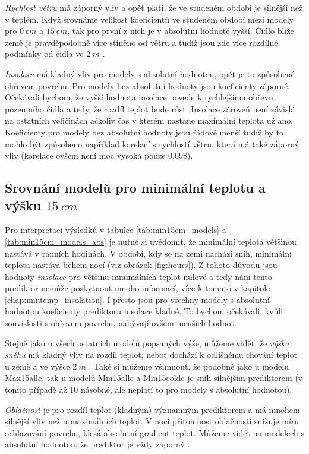 \textit{Rychlost větru} má záporný vliv a opět platí, že ve studeném období je silnější než v teplém. Když srovnáme velikost koeficientů ve studeném období mezi modely pro $\SI{0}{cm}$ a $\SI{15}{cm}$, tak pro první z nich je v absolutní hodnotě vyšší. Čidlo blíže země je pravděpodobně více stíněno od větru a tudíž jsou zde více rozdílné podmínky od čidla ve $\SI{2}{m}$ \parencite{wind_contrastingmicroclimates}. 

\textit{Insolace} má kladný vliv pro modely s absolutní hodnotou, opět je to způsobené ohřevem povrchu. Pro modely bez absolutní hodnoty jsou koeficienty záporné. Očekávali bychom, že vyšší hodnota insolace povede k rychlejšímu ohřevu pozemního čidla a tedy, že rozdíl teplot bude růst. Insolace zároveň není závislá na ostatních veličinách ačkoliv čas v kterém nastane maximální teplota už ano. Koeficienty pro modely bez absolutní hodnoty jsou řádově menší tudíž by to mohlo být způsobeno například korelací s rychlostí větru, která má také záporný vliv (korelace ovšem není moc vysoká pouze $0.098$).

\subsection{Srovnání modelů pro minimální teplotu a výšku $\SI{15}{cm}$}
Pro interpretaci výsledků v tabulce \ref{tab:min15cm_models} a \ref{tab:min15cm_models_abs} je nutné si uvědomit, že minimální teplota většinou nastává v ranních hodinách. V období, kdy se na zemi nachází sníh, minimální teplota nastává během nocí (viz obrázek \ref{fig:hours}). Z tohoto důvodu jsou hodnoty \textit{insolace} pro většinu minimálních teplot nulové a tedy nám tento prediktor nemůže poskytnout mnoho informací, více k tomuto v kapitole \ref{chap:mintemp_insolation}. I přesto jsou pro všechny modely s absolutní hodnotou koeficienty prediktoru insolace kladné. To bychom očekávali, kvůli souvislosti s ohřevem povrchu, nabývají ovšem menších hodnot.

Stejně jako u všech ostatních modelů popsaných výše, můžeme vidět, že \textit{výška sněhu} má kladný vliv na rozdíl teplot, neboť dochází k odlišnému chování teplot u země a ve výšce $\SI{2}{m}$ \parencite{snow_deFrenneForestMicroclimates}. Také si můžeme všimnout, že podobně jako u modelu Max15allc, tak u modelů Min15allc a Min15coldc je sníh silnějším prediktorem (v tomto případě až 10 násobně, ale neplatí to pro modely s absolutní hodnotou). 

\textit{Oblačnost} je pro rozdíl teplot (kladným) významným prediktorem a má mnohem silnější vliv než u maximálních teplot. V noci přítomnost oblačnosti snižuje míru ochlazování povrchu, klesá absolutní gradient teplot. Můžeme vidět na modelech s absolutní hodnotou, že prediktor je vždy záporný \parencite{cloud_overwinteringclusters}. 

